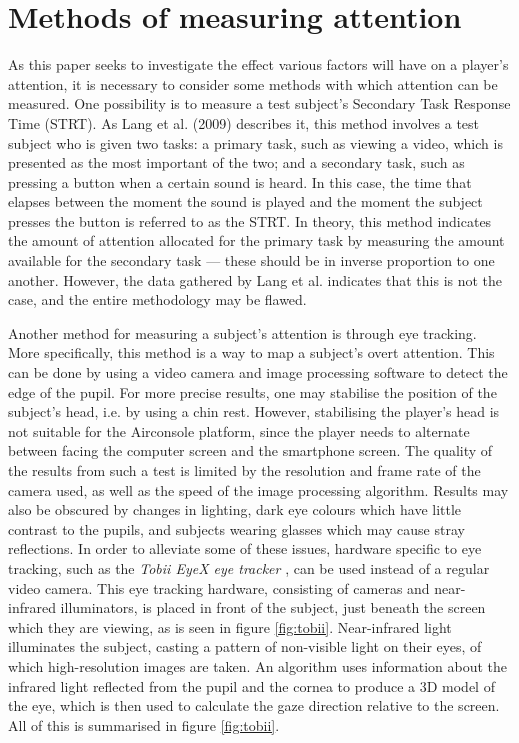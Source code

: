 \section{Methods of measuring attention}\label{sec:measurement}
As this paper seeks to investigate the effect various factors will have on a player’s attention, it is necessary to consider some methods with which attention can be measured. One possibility is to measure a test subject’s Secondary Task Response Time (STRT). As Lang et al. (2009) \cite{Lang2009} describes it, this method involves a test subject who is given two tasks: a primary task, such as viewing a video, which is presented as the most important of the two; and a secondary task, such as pressing a button when a certain sound is heard. In this case, the time that elapses between the moment the sound is played and the moment the subject presses the button is referred to as the STRT. In theory, this method indicates the amount of attention allocated for the primary task by measuring the amount available for the secondary task --- these should be in inverse proportion to one another. However, the data gathered by Lang et al.\cite{Lang2009} indicates that this is not the case, and the entire methodology may be flawed.

Another method for measuring a subject’s attention is through eye tracking. More specifically, this method is a way to map a subject’s overt attention. This can be done by using a video camera and image processing software to detect the edge of the pupil. For more precise results, one may stabilise the position of the subject’s head, i.e. by using a chin rest. However, stabilising the player’s head is not suitable for the Airconsole platform, since the player needs to alternate between facing the computer screen and the smartphone screen. The quality of the results from such a test is limited by the resolution and frame rate of the camera used, as well as the speed of the image processing algorithm. Results may also be obscured by changes in lighting, dark eye colours which have little contrast to the pupils, and subjects wearing glasses which may cause stray reflections. In order to alleviate some of these issues, hardware specific to eye tracking, such as the \textit{Tobii EyeX eye tracker} \cite{TobiiPro}, can be used instead of a regular video camera. This eye tracking hardware, consisting of cameras and near-infrared illuminators, is placed in front of the subject, just beneath the screen which they are viewing, as is seen in figure \ref{fig:tobii}. Near-infrared light illuminates the subject, casting a pattern of non-visible light on their eyes, of which high-resolution images are taken. An algorithm uses information about the infrared light reflected from the pupil and the cornea to produce a 3D model of the eye, which is then used to calculate the gaze direction relative to the screen. All of this is summarised in figure \ref{fig:tobii}.


